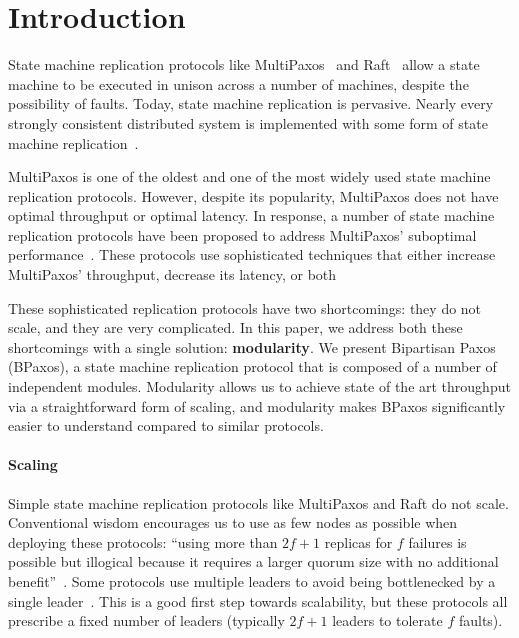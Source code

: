 \section{Introduction}
State machine replication protocols like MultiPaxos~\cite{lamport1998part,
lamport2001paxos} and Raft~\cite{ongaro2014search} allow a state machine to be
executed in unison across a number of machines, despite the possibility of
faults. Today, state machine replication is pervasive. Nearly every strongly
consistent distributed system is implemented with some form of state machine
replication~\cite{corbett2013spanner, thomson2012calvin, burrows2006chubby,
baker2011megastore, cockroach2019website, cosmos2019website, tidb2019website,
yugabyte2019website}.

MultiPaxos is one of the oldest and one of the most widely used state machine
replication protocols. However, despite its popularity, MultiPaxos does not have
optimal throughput or optimal latency. In response, a number of state machine
replication protocols have been proposed to address MultiPaxos' suboptimal
performance~\cite{%
  arun2017speeding,
  biely2012s,
  howard2016flexible,
  lamport2005generalized,
  lamport2006fast,
  li2016just,
  mao2008mencius,
  moraru2013there,
  nawab2018dpaxos,
  park2019exploiting,
  ports2015designing
}.
These protocols use sophisticated techniques that either increase MultiPaxos'
throughput, decrease its latency, or both

These sophisticated replication protocols have two shortcomings: they do not
scale, and they are very complicated. In this paper, we address both these
shortcomings with a single solution: \textbf{modularity}. We present Bipartisan
Paxos (BPaxos), a state machine replication protocol that is composed of a
number of independent modules. Modularity allows us to achieve state of the art
throughput via a straightforward form of scaling, and modularity makes BPaxos
significantly easier to understand compared to similar protocols.

\paragraph{Scaling}
Simple state machine replication protocols like MultiPaxos and Raft do not
scale. Conventional wisdom encourages us to use as few nodes as possible when
deploying these protocols: ``using more than $2f+1$ replicas for $f$ failures
is possible but illogical because it requires a larger quorum size with no
additional benefit''~\cite{zhang2018building}. Some protocols use multiple
leaders to avoid being bottlenecked by a single leader~\cite{mao2008mencius,
moraru2013there, arun2017speeding}. This is a good first step towards
scalability, but these protocols all prescribe a fixed number of leaders
(typically $2f+1$ leaders to tolerate $f$ faults).

